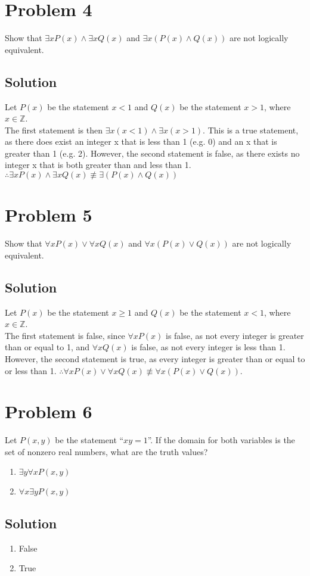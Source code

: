 \documentclass[table]{article}
\begin{document}
\section{Problem 4}
Show that $\exists xP(x) \land \exists xQ(x)$ and $\exists x(P(x) \land Q(x))$ are not logically equivalent.
\subsection{Solution}
Let $P(x)$ be the statement $x < 1$ and $Q(x)$ be the statement $x > 1$, where $x \in \mathbb{Z}$.\\
The first statement is then $\exists x(x < 1) \land \exists x(x > 1)$. This is a true statement, as there does exist an integer x that is less than 1 (e.g. 0) and an x that is greater than 1 (e.g. 2). However, the second statement is false, as there exists no integer x that is both greater than and less than 1. $\therefore \exists xP(x) \land \exists xQ(x) \not\equiv \exists (P(x) \land Q(x))$
\section{Problem 5}
Show that $\forall xP(x) \lor \forall xQ(x)$ and $\forall x(P(x) \lor Q(x))$ are not logically equivalent.
\subsection{Solution}
Let $P(x)$ be the statement $x \geq 1$ and $Q(x)$ be the statement $x < 1$, where $x \in \mathbb{Z}$.\\
The first statement is false, since $\forall xP(x)$ is false, as not every integer is greater than or equal to 1, and $\forall xQ(x)$ is false, as not every integer is less than 1. However, the second statement is true, as every integer is greater than or equal to or less than 1. $\therefore \forall xP(x) \lor \forall xQ(x) \not\equiv \forall x(P(x) \lor Q(x))$.
\section{Problem 6}
Let $P(x,y)$ be the statement ``$xy=1$''. If the domain for both variables is the set of nonzero real numbers, what are the truth values?
\begin{enumerate}[nosep, label=\alph*)]
\item $\exists y \forall x P(x,y)$
\item $\forall x \exists y P(x,y)$
\end{enumerate}
\subsection{Solution}
\begin{enumerate}[nosep, label=\alph*)]
\item False
\item True
\end{enumerate}
\end{document}
